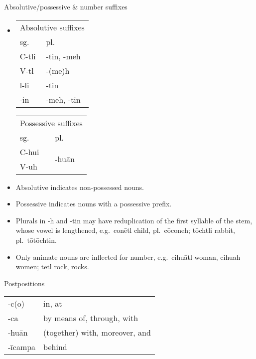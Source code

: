 \documentclass[12pt]{beamer}
\newcommand{\nah}[1]{\textcolor{nahgrn}{#1}}
\newcommand{\trs}[1]{\textcolor{nahblu}{#1}}
\begin{document}
\begin{frame}
\begin{columns}[t]
\begin{column}{.23\linewidth}
      \begin{block}{Absolutive/possessive \& number suffixes}
        \begin{itemize}
        \item
          \begin{tabular}[t]{ll}
            \multicolumn{2}{c}{Absolutive suffixes} \\
            sg.   & pl. \\
            \nah{C-tli} & \nah{-tin, -meh} \\
            \nah{V-tl}  & \nah{-(me)h} \\
            \nah{l-li}  & \nah{-tin} \\
            \nah{-in}   & \nah{-meh, -tin} \\
          \end{tabular}%
          \qquad
          \begin{tabular}[t]{ll}
            \multicolumn{2}{c}{Possessive suffixes} \\
            sg.   & pl. \\
            \nah{C-hui} & \multicolumn{1}{l}{\multirow{2}[0]{*}{\nah{-huān}}} \\
            \nah{V-uh}  &  \\
          \end{tabular}%
        \item Absolutive indicates non-possessed nouns.
        \item Possessive indicates nouns with a possessive prefix.
        \item Plurals in \nah{-h} and \nah{-tin} may have reduplication of the first syllable of the stem, whose vowel is lengthened, e.g.~\nah{conētl} \trs{child}, pl.~\nah{cōconeh}; \nah{tōchtli} \trs{rabbit}, pl.~\nah{tōtōchtin}.
        \item Only animate nouns are inflected for number, e.g.~\nah{cihuātl} \trs{woman}, \nah{cihuah} \trs{women}; \nah{tetl} \trs{rock, rocks}. 
        \end{itemize}
      \end{block}
      \begin{block}{Postpositions}
        \begin{tabular}{ll}
          \nah{-c(o)} & \trs{in, at} \\
          \nah{-ca} & \trs{by means of, through, with} \\
          \nah{-huān} & \trs{(together) with, moreover, and} \\
          \nah{-īcampa} & \trs{behind} \\

\end{tabular}
\end{block}
\end{column}
\end{columns}
\end{frame}
\end{document}
